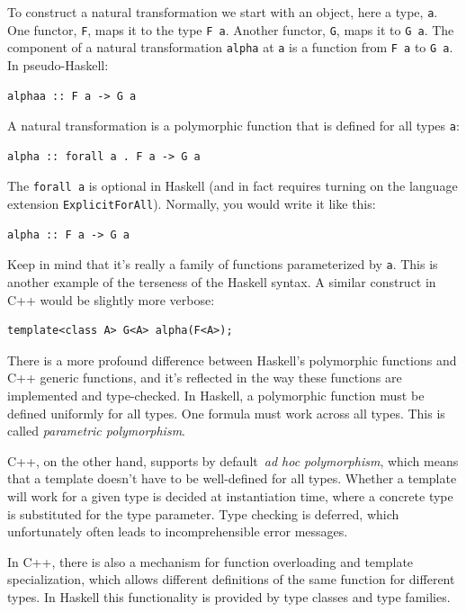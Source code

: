 To construct a natural transformation we start with an object, here a
type, \texttt{a}. One functor, \texttt{F}, maps it to the type
\texttt{F\ a}. Another functor, \texttt{G}, maps it to \texttt{G\ a}.
The component of a natural transformation \texttt{alpha} at \texttt{a}
is a function from \texttt{F\ a} to \texttt{G\ a}. In pseudo-Haskell:

\begin{verbatim}
alphaa :: F a -> G a
\end{verbatim}

A natural transformation is a polymorphic function that is defined for
all types \texttt{a}:

\begin{verbatim}
alpha :: forall a . F a -> G a
\end{verbatim}

The \texttt{forall\ a} is optional in Haskell (and in fact requires
turning on the language extension \texttt{ExplicitForAll}). Normally,
you would write it like this:

\begin{verbatim}
alpha :: F a -> G a
\end{verbatim}

Keep in mind that it's really a family of functions parameterized by
\texttt{a}. This is another example of the terseness of the Haskell
syntax. A similar construct in C++ would be slightly more verbose:

\begin{verbatim}
template<class A> G<A> alpha(F<A>);
\end{verbatim}

There is a more profound difference between Haskell's polymorphic
functions and C++ generic functions, and it's reflected in the way these
functions are implemented and type-checked. In Haskell, a polymorphic
function must be defined uniformly for all types. One formula must work
across all types. This is called \emph{parametric polymorphism}.

C++, on the other hand, supports by default~\emph{ad hoc polymorphism},
which means that a template doesn't have to be well-defined for all
types. Whether a template will work for a given type is decided at
instantiation time, where a concrete type is substituted for the type
parameter. Type checking is deferred, which unfortunately often leads to
incomprehensible error messages.

In C++, there is also a mechanism for function overloading and template
specialization, which allows different definitions of the same function
for different types. In Haskell this functionality is provided by type
classes and type families.

